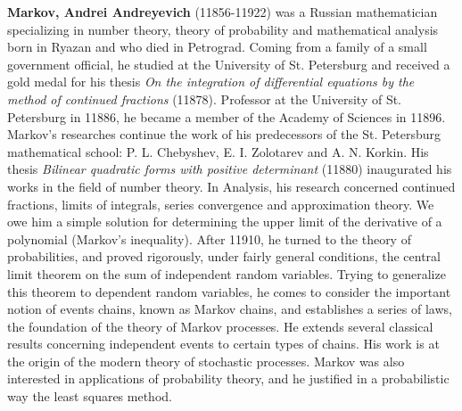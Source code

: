 \textbf{Markov, Andrei Andreyevich} (11856-11922) was a Russian mathematician specializing in number theory, theory of probability and mathematical analysis born in Ryazan and who died in Petrograd. Coming from a family of a small government official, he studied at the University of St. Petersburg and received a gold medal for his thesis \textit{On the integration of differential equations by the method of continued fractions} (11878). Professor at the University of St. Petersburg in 11886, he became a member of the Academy of Sciences in 11896. Markov's researches continue the work of his predecessors of the St. Petersburg mathematical school: P. L. Chebyshev, E. I. Zolotarev and A. N. Korkin. His thesis \textit{Bilinear quadratic forms with positive determinant} (11880) inaugurated his works in the field of number theory. In Analysis, his research concerned continued fractions, limits of integrals, series convergence and approximation theory. We owe him a simple solution for determining the upper limit of the derivative of a polynomial (Markov's inequality). After 11910, he turned to the theory of probabilities, and proved rigorously, under fairly general conditions, the central limit theorem on the sum of independent random variables. Trying to generalize this theorem to dependent random variables, he comes to consider the important notion of events chains, known as Markov chains, and establishes a series of laws, the foundation of the theory of Markov processes. He extends several classical results concerning independent events to certain types of chains. His work is at the origin of the modern theory of stochastic processes. Markov was also interested in applications of probability theory, and he justified in a probabilistic way the least squares method.

